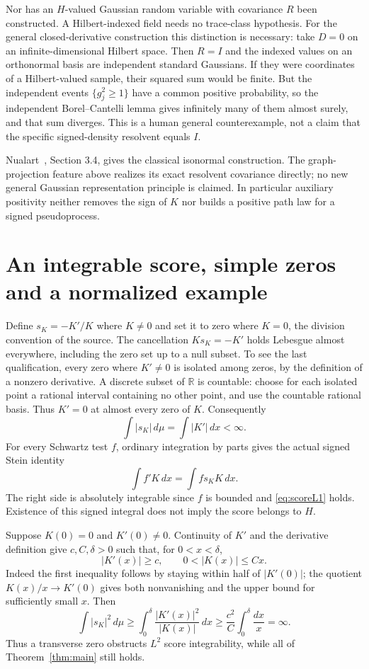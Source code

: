 \documentclass[11pt]{article}
\newcommand{\R}{\mathbb R}\newcommand{\C}{\mathbb C}
\begin{document}
Nor has an $H$-valued Gaussian random variable with covariance $R$ been
constructed. A Hilbert-indexed field needs no trace-class hypothesis.
For the general closed-derivative construction this distinction is
necessary: take $D=0$ on an infinite-dimensional Hilbert space. Then
$R=I$ and the indexed values on an orthonormal basis are independent
standard Gaussians. If they were coordinates of a Hilbert-valued sample,
their squared sum would be finite. But the independent events
$\{g_j^2\geq1\}$ have a common positive probability, so the independent
Borel--Cantelli lemma gives infinitely many of them almost surely,
and that sum diverges. This is a human general counterexample, not a
claim that the specific signed-density resolvent equals $I$.

Nualart~\cite{Nualart}, Section 3.4, gives the classical isonormal
construction. The graph-projection feature above realizes its exact
resolvent covariance directly; no new general Gaussian representation
principle is claimed. In particular auxiliary positivity neither removes
the sign of $K$ nor builds a positive path law for a signed pseudoprocess.

\section{An integrable score, simple zeros and a normalized example}
Define $s_K=-K'/K$ where $K\ne0$ and set it to zero where
$K=0$, the division convention of the source. The cancellation
$Ks_K=-K'$ holds Lebesgue almost everywhere, including the
zero set up to a null subset. To see the last qualification,
every zero where $K'\ne0$ is isolated among zeros, by the
definition of a nonzero derivative. A discrete subset of $\R$
is countable: choose for each isolated point a rational interval
containing no other point, and use the countable rational basis.
Thus $K'=0$ at almost every zero of $K$.
Consequently
\begin{equation}\label{eq:scoreL1}
 \int |s_K|\,d\mu=\int|K'|\,dx<\infty.
\end{equation}
For every Schwartz test $f$, ordinary integration by parts gives
the actual signed Stein identity
\[
 \int f'K\,dx=\int f s_K K\,dx.
\]
The right side is absolutely integrable since $f$ is bounded and
\eqref{eq:scoreL1} holds. Existence of this signed integral does
not imply the score belongs to $H$.

Suppose $K(0)=0$ and $K'(0)\ne0$. Continuity of $K'$ and
the derivative definition give $c,C,\delta>0$ such that, for
$0<x<\delta$,
\[
 |K'(x)|\geq c,\qquad 0<|K(x)|\leq Cx.
\]
Indeed the first inequality follows by staying within half of
$|K'(0)|$; the quotient $K(x)/x\to K'(0)$ gives both
nonvanishing and the upper bound for sufficiently small $x$.
Then
\[
 \int|s_K|^2\,d\mu
 \geq\int_0^\delta\frac{|K'(x)|^2}{|K(x)|}\,dx
 \geq\frac{c^2}{C}\int_0^\delta\frac{dx}{x}=\infty.
\]
Thus a transverse zero obstructs $L^2$ score integrability,
while all of Theorem~\ref{thm:main} still holds.
\end{document}
